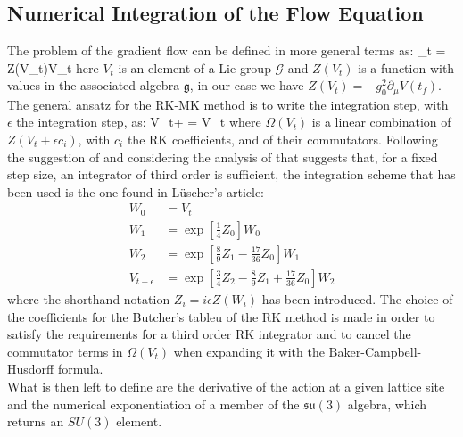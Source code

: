 \subsection{Numerical Integration of the Flow Equation}
The problem of the gradient flow can be defined in more general terms as:
\beq
    _t =  Z(V_t)V_t
\eeq
here $V_t$ is an element of a Lie group $\mathcal{G}$ and $Z(V_t)$ is a function with values in the associated algebra $\mathfrak{g}$, in our case we have $Z(V_t) = -g_0^2\partial_\mu V(t_f)$. The general ansatz for the RK-MK method is to write the integration step, with $\epsilon$ the integration step,  as:
\beq
    V_{t+\epsilon} =   V_t
\eeq
where $\Omega(V_t)$ is a linear combination of $Z(V_t + \epsilon c_i)$, with $c_i$ the RK coefficients, and of their commutators. 
Following the suggestion of \cite{luscher_properties_2010} and considering the analysis of \cite{ce_non-gaussianities_2015} that suggests that, for a fixed step size, an integrator of third order is sufficient, the integration scheme that has been used is the one found in L{\"u}scher's article:
\begin{align}
    \label{eq:integrator}
    W_0 &= V_t\\\nonumber
    W_1 &= \exp\left[ \frac{1}{4}Z_0 \right] W_0 \\\nonumber
    W_2 &= \exp\left[ \frac{8}{9}Z_1 - \frac{17}{36}Z_0 \right] W_1\\\nonumber
    V_{t+\epsilon} &= \exp\left[ \frac{3}{4}Z_2 - \frac{8}{9}Z_1 + \frac{17}{36}Z_0\right] W_2
\end{align}
where the shorthand notation $Z_i = i\epsilon Z(W_i)$ has been introduced. The choice of the coefficients for the Butcher's tableu of the RK method is made in order to satisfy the requirements for a third order RK integrator and to cancel the commutator terms in $\Omega(V_t)$ when expanding it with the Baker-Campbell-Husdorff formula. \\
What is then left to define are the derivative of the action at a given lattice site and the numerical exponentiation of a member of the $\mathfrak{su}(3)$ algebra, which returns an $SU(3)$ element.

